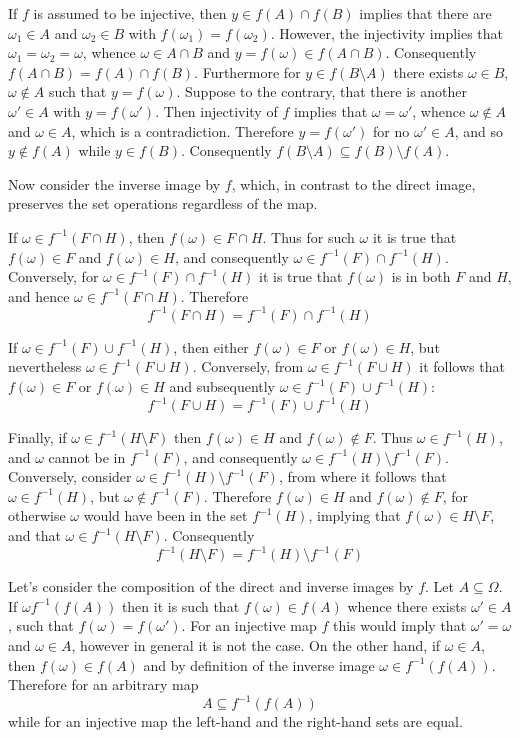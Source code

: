 \documentclass[a4paper]{article}
\begin{document}
If $f$ is assumed to be injective, then $y\in f(A)\cap f(B)$ implies that there are $\omega_1\in A$ and $\omega_2\in B$ with $f(\omega_1)=f(\omega_2)$. However, the injectivity implies that $\omega_1=\omega_2=\omega$, whence $\omega\in A\cap B$ and $y=f(\omega)\in f(A\cap B)$. Consequently $f(A\cap B) = f(A)\cap f(B)$.
Furthermore for $y\in f(B\setminus A)$ there exists $\omega\in B$, $\omega\notin A$ such that $y=f(\omega)$. Suppose to the contrary, that there is another $\omega'\in A$ with $y=f(\omega')$. Then injectivity of $f$ implies that $\omega=\omega'$, whence $\omega\notin A$ and $\omega\in A$, which is a contradiction. Therefore $y=f(\omega')$ for no $\omega'\in A$, and so $y\notin f(A)$ while $y\in f(B)$. Consequently $f(B\setminus A)\subseteq f(B)\setminus f(A)$.

Now consider the inverse image by $f$, which, in contrast to the direct image, preserves the set operations regardless of the map.

If $\omega\in f^{-1}(F\cap H)$, then $f(\omega)\in F\cap H$. Thus for such $\omega$ it is true that $f(\omega)\in F$ and $f(\omega)\in H$, and consequently $\omega\in f^{-1}(F)\cap f^{-1}(H)$. Conversely, for $\omega\in f^{-1}(F)\cap f^{-1}(H)$ it is true that $f(\omega)$ is in both $F$ and $H$, and hence $\omega\in f^{-1}(F\cap H)$. Therefore \[f^{-1}(F\cap H) = f^{-1}(F)\cap f^{-1}(H)\]

If $\omega\in f^{-1}(F)\cup f^{-1}(H)$, then either $f(\omega)\in F$ or $f(\omega)\in H$, but nevertheless $\omega\in f^{-1}(F\cup H)$. Conversely, from $\omega\in f^{-1}(F\cup H)$ it follows that $f(\omega)\in F$ or $f(\omega)\in H$ and subsequently $\omega\in f^{-1}(F)\cup f^{-1}(H)$:\[f^{-1}(F\cup H) = f^{-1}(F)\cup f^{-1}(H)\]

Finally, if $\omega\in f^{-1}(H\setminus F)$ then $f(\omega)\in H$ and $f(\omega)\notin F$. Thus $\omega\in f^{-1}(H)$, and $\omega$ cannot be in $f^{-1}(F)$, and consequently $\omega\in f^{-1}(H)\setminus f^{-1}(F)$. Conversely, consider $\omega\in f^{-1}(H)\setminus f^{-1}(F)$, from where it follows that $\omega\in f^{-1}(H)$, but $\omega\notin f^{-1}(F)$. Therefore $f(\omega)\in H$ and $f(\omega)\notin F$, for otherwise $\omega$ would have been in the set $f^{-1}(H)$, implying that $f(\omega)\in H\setminus F$, and that $\omega\in f^{-1}(H\setminus F)$. Consequently \[f^{-1}(H\setminus F) = f^{-1}(H)\setminus f^{-1}(F)\]

Let's consider the composition of the direct and inverse images by $f$. Let $A\subseteq \Omega$. If $\omega f^{-1}(f(A))$ then it is such that $f(\omega)\in f(A)$ whence there exists $\omega'\in A$, such that $f(\omega)=f(\omega')$. For an injective map $f$ this would imply that $\omega'=\omega$ and $\omega\in A$, however in general it is not the case. On the other hand, if $\omega\in A$, then $f(\omega)\in f(A)$ and by definition of the inverse image $\omega\in f^{-1}(f(A))$. Therefore for an arbitrary map \[A\subseteq f^{-1}(f(A))\] while for an injective map the left-hand and the right-hand sets are equal.
\end{document}
